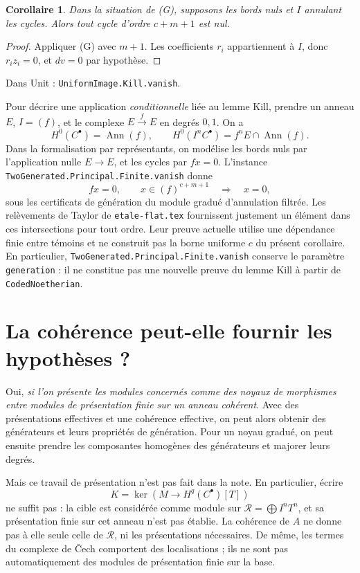 \documentclass[11pt]{amsart}
\newtheorem{corollary}[proposition]{Corollaire}
\begin{document}
\begin{corollary}
Dans la situation de \textup{(G)}, supposons les bords nuls et $I$
annulant les cycles. Alors tout cycle d'ordre $c+m+1$ est nul.
\end{corollary}
\begin{proof}
Appliquer (G) avec $m+1$. Les coefficients $r_i$ appartiennent à $I$,
donc $r_i z_i=0$, et $dv=0$ par hypothèse.
\end{proof}

Dans Unit : \texttt{UniformImage.Kill.vanish}.

Pour décrire une application \emph{conditionnelle} liée au lemme Kill,
prendre un anneau $E$,
$I=(f)$, et le complexe $E\xrightarrow{f}E$ en degrés $0,1$.
On a
\[
 H^0(C^\bullet)=\operatorname{Ann}(f),\qquad
 H^0(I^nC^\bullet)=f^nE\cap\operatorname{Ann}(f).
\]
Dans la formalisation par représentants, on modélise les bords nuls
par l'application nulle $E\to E$, et les cycles par $fx=0$.
L'instance \texttt{TwoGenerated.Principal.Finite.vanish} donne
\[
 fx=0,\qquad x\in(f)^{c+m+1}\quad\Longrightarrow\quad x=0,
\]
sous les certificats de génération du module gradué d'annulation filtrée.
Les relèvements de Taylor de \texttt{etale-flat.tex} fournissent justement
un élément dans ces intersections pour tout ordre. Leur preuve actuelle
utilise une dépendance finie entre témoins et ne construit pas la borne
uniforme $c$ du présent corollaire.
En particulier, \texttt{TwoGenerated.Principal.Finite.vanish} conserve
le paramètre \texttt{generation} : il ne constitue pas une nouvelle
preuve du lemme Kill à partir de \texttt{CodedNoetherian}.

\section{La cohérence peut-elle fournir les hypothèses ?}\label{sec:coherence}

Oui, \emph{si l'on présente les modules concernés comme des noyaux de
morphismes entre modules de présentation finie sur un anneau cohérent}.
Avec des présentations effectives et une cohérence effective, on peut
alors obtenir des générateurs et leurs propriétés de génération.
Pour un noyau gradué, on peut ensuite prendre les composantes homogènes
des générateurs et majorer leurs degrés.

Mais ce travail de présentation n'est pas fait dans la note.
En particulier, écrire
\[
 K=\ker\left(M\longrightarrow H^q(C^\bullet)[T]\right)
\]
ne suffit pas : la cible est considérée comme module sur
$\mathcal R=\bigoplus I^nT^n$, et sa présentation finie sur cet anneau
n'est pas établie. La cohérence de $A$ ne donne pas à elle seule celle
de $\mathcal R$, ni les présentations nécessaires. De même, les termes
du complexe de \v Cech comportent des localisations ; ils ne sont pas
automatiquement des modules de présentation finie sur la base.
\end{document}
